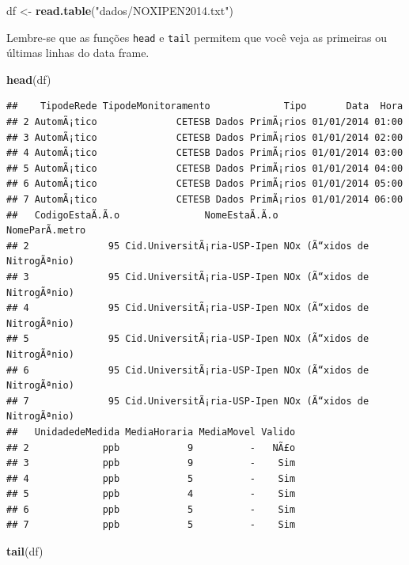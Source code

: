 \documentclass[]{book}
\newenvironment{Shaded}{\begin{snugshade}}{\end{snugshade}}
\newcommand{\KeywordTok}[1]{\textcolor[rgb]{0.13,0.29,0.53}{\textbf{#1}}}
\newcommand{\StringTok}[1]{\textcolor[rgb]{0.31,0.60,0.02}{#1}}
\newcommand{\NormalTok}[1]{#1}
\theoremstyle{definition}
\theoremstyle{definition}
\theoremstyle{definition}
\theoremstyle{remark}
\begin{document}
\begin{Shaded}
\begin{Highlighting}[]
\NormalTok{df <-}\StringTok{ }\KeywordTok{read.table}\NormalTok{(}\StringTok{"dados/NOXIPEN2014.txt"}\NormalTok{)}
\end{Highlighting}
\end{Shaded}

Lembre-se que as funções \texttt{head} e \texttt{tail} permitem que você
veja as primeiras ou últimas linhas do data frame.

\begin{Shaded}
\begin{Highlighting}[]
\KeywordTok{head}\NormalTok{(df)}
\end{Highlighting}
\end{Shaded}

\begin{verbatim}
##    TipodeRede TipodeMonitoramento             Tipo       Data  Hora
## 2 AutomÃ¡tico              CETESB Dados PrimÃ¡rios 01/01/2014 01:00
## 3 AutomÃ¡tico              CETESB Dados PrimÃ¡rios 01/01/2014 02:00
## 4 AutomÃ¡tico              CETESB Dados PrimÃ¡rios 01/01/2014 03:00
## 5 AutomÃ¡tico              CETESB Dados PrimÃ¡rios 01/01/2014 04:00
## 6 AutomÃ¡tico              CETESB Dados PrimÃ¡rios 01/01/2014 05:00
## 7 AutomÃ¡tico              CETESB Dados PrimÃ¡rios 01/01/2014 06:00
##   CodigoEstaÃ.Ã.o               NomeEstaÃ.Ã.o               NomeParÃ.metro
## 2              95 Cid.UniversitÃ¡ria-USP-Ipen NOx (Ã“xidos de NitrogÃªnio)
## 3              95 Cid.UniversitÃ¡ria-USP-Ipen NOx (Ã“xidos de NitrogÃªnio)
## 4              95 Cid.UniversitÃ¡ria-USP-Ipen NOx (Ã“xidos de NitrogÃªnio)
## 5              95 Cid.UniversitÃ¡ria-USP-Ipen NOx (Ã“xidos de NitrogÃªnio)
## 6              95 Cid.UniversitÃ¡ria-USP-Ipen NOx (Ã“xidos de NitrogÃªnio)
## 7              95 Cid.UniversitÃ¡ria-USP-Ipen NOx (Ã“xidos de NitrogÃªnio)
##   UnidadedeMedida MediaHoraria MediaMovel Valido
## 2             ppb            9          -   NÃ£o
## 3             ppb            9          -    Sim
## 4             ppb            5          -    Sim
## 5             ppb            4          -    Sim
## 6             ppb            5          -    Sim
## 7             ppb            5          -    Sim
\end{verbatim}

\begin{Shaded}
\begin{Highlighting}[]
\KeywordTok{tail}\NormalTok{(df)}
\end{Highlighting}
\end{Shaded}
\end{document}
